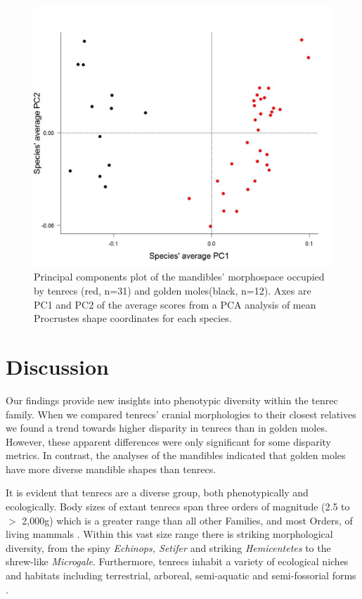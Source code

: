 \documentclass[12pt,a4paper]{article}
\begin{document}
	\begin{figure}[H]
	\centering
	\includegraphics[width=1\linewidth]{figures/Mands_Tenrecs+Gmoles_PC1PC2_01_05_14.jpg}
	\caption{Principal components plot of the mandibles' morphospace occupied by tenrecs (red, n=31) and golden moles(black, n=12). Axes are PC1 and PC2 of the average scores from a PCA analysis of mean Procrustes shape coordinates for each species. }
	\label{fig:mandsPCA}

	\end{figure}


\section{Discussion} 

	Our findings provide new insights into phenotypic diversity within the tenrec family. 
	When we compared tenrecs' cranial morphologies to their closest relatives we found a trend towards higher disparity in tenrecs than in golden moles. However, these apparent differences were only significant for some disparity metrics. In contrast, the analyses of the mandibles indicated that golden moles have more diverse mandible shapes than tenrecs.



	It is evident that tenrecs are a diverse group, both phenotypically and ecologically. Body sizes of extant tenrecs span three orders of magnitude (2.5 to $>$ 2,000g) which is a greater range than all other Families, and most Orders, of living mammals \citep{Olson2003}. Within this vast size range there is striking morphological diversity, from the spiny \textit{Echinops, Setifer} and striking \textit{Hemicentetes} to the shrew-like  \textit{Microgale}. Furthermore, tenrecs inhabit a variety of ecological niches and habitats including terrestrial, arboreal, semi-aquatic and semi-fossorial forms \citep{Soarimalala2011}. 
	
\end{document}
